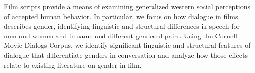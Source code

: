 Film scripts provide a means of examining generalized western social perceptions of accepted human behavior. In particular, we focus on how dialogue in films describes gender, identifying linguistic and structural differences in speech for men and women and in same and different-gendered pairs. Using the Cornell Movie-Dialogs Corpus, we identify significant linguistic and structural features of dialogue that differentiate genders in conversation and analyze how those effects relate to existing literature on gender in film.
